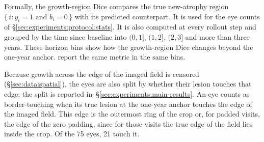 Formally, the growth-region Dice compares the true new-atrophy region
$\{\, i : y_i = 1 \text{ and } b_i = 0 \,\}$ with its predicted
counterpart. It is used for the eye counts of
\S\ref{sec:experiments:protocol:stats}. It is also computed at every
rollout step and grouped by the time since baseline into $(0, 1]$,
$(1, 2]$, $(2, 3]$ and more than three years. These horizon bins show how
the growth-region Dice changes beyond the one-year anchor. \citet{Mai2024} report
the same metric in the same bins.

Because growth across the edge of the imaged field is censored
(\S\ref{sec:data:spatial}), the eyes are also split by whether their lesion
touches that edge; the split is reported
in~\S\ref{sec:experiments:main-results}. An eye counts as border-touching
when its true lesion at the one-year anchor touches the edge of the imaged field.
This edge is the outermost ring of the crop or, for padded visits, the edge
of the zero padding, since for those visits the true edge of the field lies
inside the crop. Of the 75 eyes, 21 touch it.

